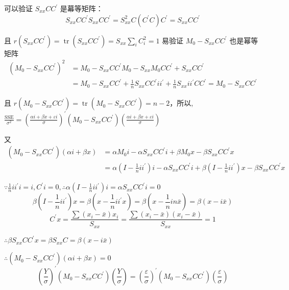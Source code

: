 可以验证 $ S_{x x} C C^{\prime} $  是幕等矩阵：
$$  S_{x x} C C^{\prime}S_{x x} C C^{\prime}=S_{x x}^{2} C\left(C^{\prime} C\right) C^{\prime}=S_{x x} C C^{\prime} $$

 且 $ r\left(S_{x x} C C^{\prime}\right)=\operatorname{tr}\left(S_{x x} C C^{\prime}\right)=S_{x x} \sum_{i} C_{i}^{2}=1 $
 易验证 $ M_{0}-S_{x x} C C^{\prime} $ 也是幂等矩阵
 \begin{align*}
	\left(M_{0}-S_{x x} C C^{\prime}\right)^{2}& = M_{0}-S_{x x} C C^{\prime} M_{0}-S_{x x} M_{0} C C^{\prime}+S_{x x} C C^{\prime}  \\
	&=M_{0}-S_{x x} C C^{\prime}+\frac{1}{n} S_{x x} C C^{\prime} i i^{\prime}+\frac{1}{n} S_{x x} i i^{\prime} C C^{\prime} 
	=M_{0}-S_{x x} C C^{\prime}
 \end{align*}

 且 $ r\left(M_{0}-S_{x x} C C^{\prime}\right)=\operatorname{tr}\left(M_{0}-S_{x x} C C^{\prime}\right)=n-2  $，所以,
 $ \frac{\text{SSE}}{\sigma^{2}} = \left(\frac{\alpha i+\beta x+\varepsilon i}{\sigma}\right)^{\prime}
     \left(M_{0}-S_{x x} C C^{\prime}\right)\left(\frac{\alpha i+\beta x+\varepsilon i}{\sigma}\right) $

 又
\begin{align*}
	 \left(M_{0}-S_{x x} C C^{\prime}\right)(\alpha i+\beta x) & = \alpha M_{0} i-\alpha S_{x x} C C^{\prime} i+\beta M_{0} x-\beta S_{x x} C C^{\prime} x \\
	& = \alpha\left(I-\frac{1}{n} i i^{\prime}\right) i-\alpha S_{x x} C C^{\prime} i+\beta\left(I-\frac{1}{n} i i^{\prime}\right) x-\beta S_{x x} C C^{\prime} x 
\end{align*}

$ \because \frac{1}{n} i i^{\prime} i=i, C^{\prime} i=0  , \therefore \alpha\left(I-\frac{1}{n} i i^{\prime}\right) i=\alpha S_{x x} C C^{\prime} i=0$
\[ \beta\left(I-\frac{1}{n} i i^{\prime}\right) x=\beta\left(x-\frac{1}{n} i i^{\prime} x\right)
     =\beta\left(x-\frac{1}{n} i n \bar{x}\right)=\beta(x-i \bar{x}) \]
\[ C^{\prime} x=\frac{\sum\left(x_{i}-\bar{x}\right) x_{i}}{S_{x x}}
      =\frac{\sum\left(x_{i}-\bar{x}\right)\left(x_{i}-\bar{x}\right)}{S_{x x}}=1 \]

$ \therefore \beta S_{x x} C C^{\prime} x=\beta S_{x x} C=\beta(x-i \bar{x})$

$ \therefore\left(M_{0}-S_{x x} C C^{\prime}\right)(\alpha i+\beta x)=0 $
\[ \left(\frac{Y}{\sigma}\right)^{\prime}\left(M_{0}-S_{x x} C C^{\prime}\right)\left(\frac{Y}{\sigma}\right)
    =\left(\frac{\varepsilon}{\sigma}\right)^{\prime}\left(M_{0}-S_{x x} C C^{\prime}\right)\left(\frac{\varepsilon}{\sigma}\right) \]

